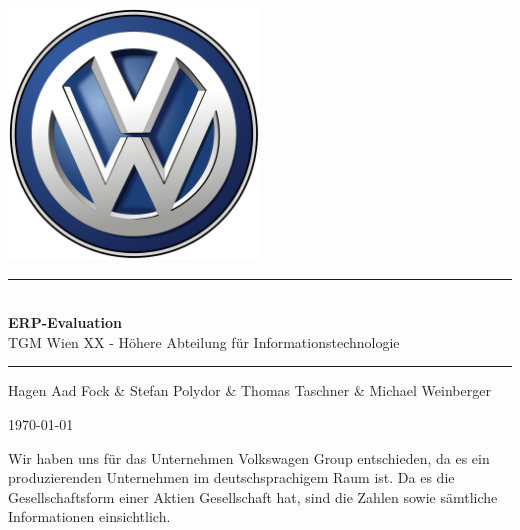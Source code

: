 \documentclass[12pt]{article}
\begin{document}
\begin{titlepage}
\begin{center}
\includegraphics[width=0.5\textwidth]{images/vwlogo}\\[1cm]    


\rule{1.0\textwidth}{1mm}
{ \huge \bfseries \\[0.4cm]  \huge ERP-Evaluation \\[0.4cm] }
\LARGE TGM Wien XX - Höhere Abteilung für Informationstechnologie  \\[0.4cm]

\rule{1.0\textwidth}{1mm}




\noindent 
\vspace{3cm}

\begin{center}
\large
Hagen Aad Fock \&
Stefan Polydor \&
Thomas Taschner \&
Michael Weinberger
\end{center}

\vfill

{\large \today}

\end{center}
\end{titlepage}

\tableofcontents


\ohead{\headmark}

\newpage

\noindent
Wir haben uns für das Unternehmen Volkswagen Group entschieden, da es ein produzierenden Unternehmen im deutschsprachigem Raum ist. Da es die Gesellschaftsform einer Aktien Gesellschaft hat, sind die Zahlen sowie sämtliche Informationen einsichtlich. 
\end{document}
